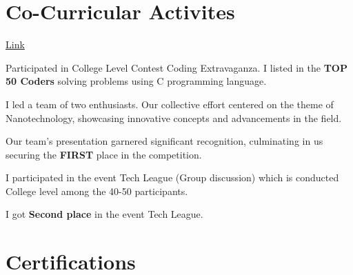 \documentclass[]{deedy-resume-openfont}
\begin{document}
\begin{minipage}[t]{0.66\textwidth}
\begin{tightemize}
{}
\end{tightemize}
\sectionsep


\sectionsep
\section{Co-Curricular Activites}

\href{}{Link}


\begin{tightemize}
\item Participated in College Level Contest Coding Extravaganza. I listed in the \textbf{TOP 50 Coders }solving problems using C programming language.
\end{tightemize}




\begin{tightemize}
\runsubsection{}
\item I led a team of two enthusiasts. Our collective effort centered on the theme of Nanotechnology, showcasing innovative concepts and advancements in the field.
\item Our team's presentation garnered significant recognition, culminating in us securing the \textbf{FIRST} place in the competition.
\end{tightemize}
\sectionsep



\begin{tightemize}
\runsubsection{}
\item I participated in the event Tech League (Group discussion) which is conducted College level among the 40-50 participants.
\item I got \textbf{Second place} in the event Tech League.
\end{tightemize}
\sectionsep




\section{Certifications} 

\end{minipage}
\end{document}
